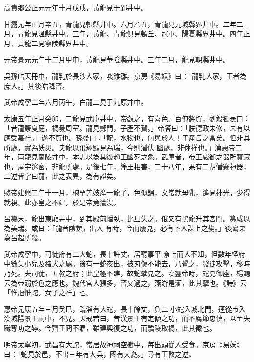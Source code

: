 \begin{pinyinscope}
 高貴鄉公正元元年十月戊戌，黃龍見于鄴井中。



 甘露元年正月辛丑，青龍見軹縣井中。六月乙丑，青龍見元城縣界井中。二年二月，青龍見溫縣井中。三年，黃龍、青龍俱見頓丘、冠軍、陽夏縣界井中。四年正月，黃龍二見寧陵縣界井中。



 元帝景元元年十二月甲申，黃龍見華陰縣井中。三年二月，龍見軹縣井中。



 吳孫皓天冊中，龍乳於長沙人家，啖雞雛。京房《易妖》曰：「龍乳人家，王者為庶人。」其後皓降晉。



 武帝咸寧二年六月丙午，白龍二見于九原井中。



 太康五年正月癸卯，二龍見武庫井中。帝觀之，有喜色。百僚將賀，劉毅獨表曰：「昔龍漦夏庭，禍發周室。龍見鄭門，子產不賀。」帝答曰：「朕德政未修，未有以應受嘉祥。」遂不賀也。孫盛曰：「龍，水物也，何與於人！子產言之當矣。但非其所處，實為妖災。夫龍以飛翔顯見為瑞，今則潛伏
 幽處，非休祥也。」漢惠帝二年，兩龍見蘭陵井中，本志以為其後趙王幽死之象。武庫者，帝王威御之器所寶藏也，屋宇邃密，非龍所處。是後七年，籓王相害，二十八年，果有二胡僭竊神器，二逆皆字曰龍，此之表異，為有證矣。



 愍帝建興二年十一月，枹罕羌妓產一龍子，色似錦，文常就母乳，遙見神光，少得就視。此亦皇之不建，於是帝竟淪沒。



 呂纂末，龍出東廂井中，到其殿前蟠臥，比旦失之。俄又有黑龍升其宮門。纂咸以為美瑞。或曰：「龍者陰類，出入
 有時，今而屢見，必有下人謀上之變。」後纂果為呂超所殺。



 武帝咸寧中，司徒府有二大蛇，長十許丈，居聽事平尞上而人不知，但數年怪府中數失小兒及豬犬之屬。後有一蛇夜出，被刃傷不能去，乃覺之，發徒攻擊，移時乃死。夫司徒，五教之府；此皇極不建，故蛇孽見之。漢靈帝時，蛇見御座，楊賜云為帝溺於色之應也。魏代宮人猥多，晉又過之，燕游是湎，此其孽也。《詩》云「惟虺惟蛇，女子之祥」也。



 惠帝元康五年三月癸巳，臨淄有大蛇，長十餘丈，負二
 小蛇入城北門，逕從市入漢城陽景王祠中，不見。天戒若曰，昔漢景王有定傾之功，而不厲節忠慎，以至失職奪功之辱。今齊王冏不寤，雖建興復之功，而驕陵取禍，此其徵也。



 明帝太寧初，武昌有大蛇，常居故神祠空樹中，每出頭從人受食。京房《易妖》曰：「蛇見於邑，不出三年有大兵，國有大憂。」尋有王敦之逆。




\end{pinyinscope}
